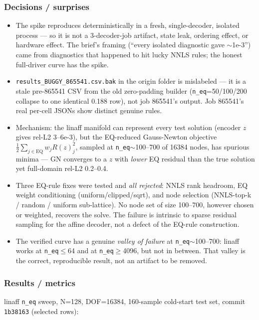 \subsubsection*{Decisions / surprises}
\begin{itemize}
  \item The spike reproduces deterministically in a fresh, single-decoder, isolated process --- so it is not a 3-decoder-job artifact, state leak, ordering effect, or hardware effect. The brief's framing (``every isolated diagnostic gave $\sim$1e-3'') came from diagnostics that happened to hit lucky NNLS rules; the honest full-driver curve has the spike.
  \item \texttt{results\_BUGGY\_865541.csv.bak} in the origin folder is mislabeled --- it is a stale pre-865541 CSV from the old zero-padding builder (\texttt{n\_eq}=50/100/200 collapse to one identical 0.188 row), not job 865541's output. Job 865541's real per-cell JSONs show distinct genuine rules.
  \item Mechanism: the linaff manifold can represent every test solution (encoder $z$ gives rel-L2 3--6e-3), but the EQ-reduced Gauss-Newton objective $\tfrac12\sum_{j\in\text{EQ}}w_j R(z)_j^2$, sampled at \texttt{n\_eq}$\sim$100--700 of 16384 nodes, has spurious minima --- GN converges to a $z$ with \emph{lower} EQ residual than the true solution yet full-domain rel-L2 0.2--0.4.
  \item Three EQ-rule fixes were tested and \emph{all rejected}: NNLS rank headroom, EQ weight conditioning (uniform/clipped/sqrt), and node selection (NNLS-top-k / random / uniform sub-lattice). No node set of size 100--700, however chosen or weighted, recovers the solve. The failure is intrinsic to sparse residual sampling for the affine decoder, not a defect of the EQ-rule construction.
  \item The verified curve has a genuine \emph{valley of failure} at \texttt{n\_eq}$\sim$100--700: linaff works at \texttt{n\_eq}$\le$64 and at \texttt{n\_eq}$\ge$4096, but not in between. That valley is the correct, reproducible result, not an artifact to be removed.
\end{itemize}

\subsubsection*{Results / metrics}
linaff \texttt{n\_eq} sweep, N=128, DOF=16384, 160-sample cold-start
test set, commit \texttt{1b38163} (selected rows):

